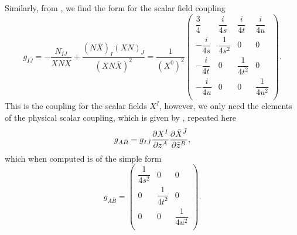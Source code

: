 Similarly, from , we find the form for the scalar field coupling
\begin{equation}
  g_{I\bar{J}} = - \frac{N_{IJ}}{XN\bar{X}} +  \frac{(N\bar{X})_I(XN)_J}{(XN\bar{X})^2}  = \frac{1}{(X^0)^2} \left(
\begin{array}{cccc}
 \dfrac{3}{4} & \dfrac{i}{4 s} & \dfrac{i}{4 t } & \dfrac{i}{4 u } \\[9pt]
 -\dfrac{i}{4 s } & \dfrac{1}{4 s^2 } & 0 & 0 \\[9pt]
 -\dfrac{i}{4 t } & 0 & \dfrac{1}{4 t^2 } & 0 \\[9pt]
 -\dfrac{i}{4 u } & 0 & 0 & \dfrac{1}{4 u^2 } \\[9pt]
\end{array}
\right).
\end{equation}
This is the coupling for the scalar fields $X^I$, however, we only need the elements of the physical scalar coupling, which is given by , repeated here
\begin{equation*}
 g_{A\bar{B}} = g_{I\bar{J}} \frac{\partial X^I}{\partial z^A}\frac{\partial \bar{X}^{\bar{J}}}{\partial \bar{z}^B},
\end{equation*}
which when computed is of the simple form
\begin{equation}
\label{eq:gab}
  g_{A\bar{B}} = \left( \begin{array}{ccc}
 \dfrac{1}{4s^2} & 0 & 0  \\[5pt]
 0 & \dfrac{1}{4t^2} & 0 \\[5pt]
 0 & 0 & \dfrac{1}{4u^2} \\[5pt] 
\end{array} \right).
\end{equation}

